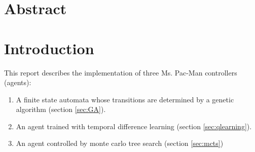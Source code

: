 \section{Abstract}
\section{Introduction}
This report describes the implementation of three Ms. Pac-Man controllers (agents):
\begin{enumerate}
	\item A finite state automata whose transitions are determined by a genetic
		algorithm (section \ref{sec:GA}).
	\item An agent trained with temporal difference learning (section
		\ref{sec:qlearning}).
	\item An agent controlled by monte carlo tree search (section \ref{sec:mcts})
\end{enumerate}
